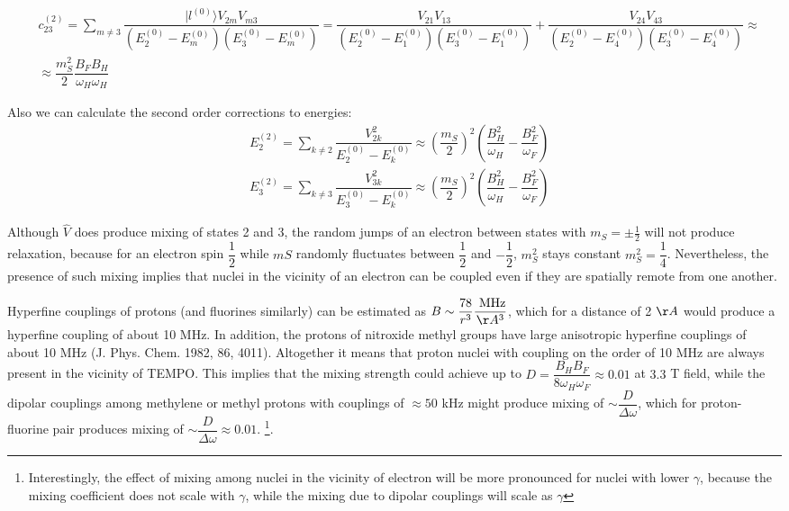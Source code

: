 \documentclass[a4paper, 12pt]{article}
\begin{document}
\begin{align*}
  &c_{23}^{(2)} = \sum_{ m \neq 3} \dfrac{\vert l^{(0)}  \rangle  V_{2m} V_{m3} }{(E_2^{(0)} - E_m^{(0)})(E_3^{(0)} - E_m^{(0)})} = \dfrac{V_{21} V_{13}}{(E_2^{(0)} - E_1^{(0)})(E_3^{(0)} - E_1^{(0)})} + \dfrac{V_{24} V_{43}}{(E_2^{(0)} - E_4^{(0)})(E_3^{(0)} - E_4^{(0)})}  \approx\\
  &\approx \dfrac{m_S^2}{2} \dfrac{B_F B_H}{\omega_H \omega_H}
\end{align*}

Also we can calculate the second order corrections to energies:
\begin{align}
    &E_2^{(2)}  = \sum_{k \neq 2}  \dfrac{V_{2k}^2}{E_2^{(0)} - E_k^{(0)}} \approx  (\dfrac{m_S}{2})^2(\dfrac{B_H^2}{\omega_H}   -  \dfrac{B_F^2}{\omega_F}  )  \\
    &E_3^{(2)}  = \sum_{k \neq 3}  \dfrac{V_{3k}^2}{E_3^{(0)} - E_k^{(0)}} \approx  (\dfrac{m_S}{2})^2(\dfrac{B_H^2}{\omega_H}   -  \dfrac{B_F^2}{\omega_F}  )  
\end{align}

Although $\hat{V}$ does produce mixing of states 2 and 3, the random jumps of an electron between states with $m_S = \pm \frac{1}{2}$ will not produce relaxation, because for an electron spin $\dfrac{1}{2}$ while $mS$ randomly fluctuates between $\dfrac{1}{2}$ and $-\dfrac{1}{2}$,  $m_S^2$ stays constant $m_S^2= \dfrac{1}{4}$. Nevertheless, the presence of such mixing implies that nuclei in the vicinity of an electron can be coupled even if they are spatially remote from one another. 

Hyperfine couplings of protons (and fluorines similarly) can be estimated as $B \sim \dfrac{78}{r^3} \dfrac{\text{ MHz} }{ \AA^3}  $, which for a distance of 2 $\AA$ would produce  a hyperfine coupling of about 10 MHz. In addition, the protons of nitroxide methyl groups have large anisotropic hyperfine couplings of about 10 MHz (J. Phys. Chem. 1982, 86, 4011). Altogether it means that proton nuclei with coupling on the order of  10 MHz are always present in the vicinity of TEMPO. This implies that the mixing strength could achieve up to $D = \dfrac{B_H B_F}{8 \omega_H \omega_F} \approx 0.01$ at $3.3$ T field, while the dipolar couplings among methylene or methyl protons with couplings of $\approx 50$ kHz might produce mixing of $\sim \dfrac{D}{\Delta \omega}$, which for proton-fluorine pair produces mixing of  $\sim \dfrac{D}{\Delta \omega} \approx 0.01$.  \footnote{Interestingly, the effect of mixing among nuclei in the vicinity of electron will be more pronounced for nuclei with lower $\gamma$, because the mixing coefficient does not scale with $\gamma$, while the mixing due to dipolar couplings will scale as $\gamma$}.
\end{document}
